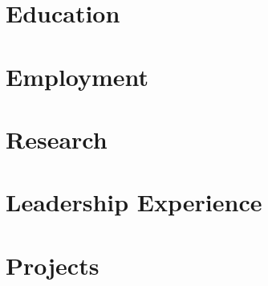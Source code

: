\documentclass{resume}
\begin{document}
\section{Education}

\section{Employment}

\section{Research}

\section{Leadership Experience}

\section{Projects}
\end{document}

